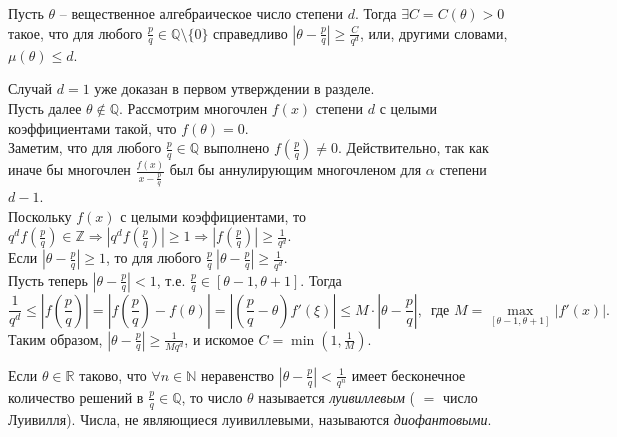 \begin{theorem}[Лиувилля]  \label{l9_Liouv}
	Пусть $\theta$ -- вещественное алгебраическое число степени $d$. Тогда $\exists C = C(\theta) > 0$ такое, что для любого $\displaystyle \frac{p}{q} \in \mathbb{Q} \setminus \lbrace 0 \rbrace$ справедливо $\displaystyle \left|\theta - \frac{p}{q}\right| \geq \frac{C}{q^d}$, или, другими словами, $\mu(\theta) \leq d$.
\end{theorem}
\begin{pf}
	Случай $d = 1$ уже доказан в первом утверждении в разделе.\\
	Пусть далее $\theta \not \in \mathbb{Q}$. Рассмотрим многочлен $f(x)$ степени $d$ с целыми коэффициентами такой, что $f(\theta) = 0$.\\
	Заметим, что для любого $\displaystyle \frac{p}{q} \in \mathbb{Q}$ выполнено $\displaystyle f\left(\frac{p}{q}\right) \ne 0$. Действительно, так как иначе бы многочлен $\displaystyle \frac{f(x)}{x - \frac{p}{q}}$ был бы аннулирующим многочленом для $\alpha$ степени $d - 1$.\\
	Поскольку $f(x)$ с целыми коэффициентами, то $\displaystyle q^d f\left(\frac{p}{q}\right) \in \mathbb{Z} \Rightarrow \left| q^d f\left(\frac{p}{q}\right) \right| \geq 1 \Rightarrow \left| f\left(\frac{p}{q}\right) \right| \geq \frac{1}{q^d}$.\\
	Если $\displaystyle \left| \theta - \frac{p}{q} \right| \geq 1$, то для любого $\displaystyle \frac{p}{q} \ \left|\theta - \frac{p}{q}\right| \geq \frac{1}{q^d}$.\\
	Пусть теперь $\displaystyle \left|\theta - \frac{p}{q}\right| < 1$, т.е. $\displaystyle \frac{p}{q} \in [\theta - 1, \theta + 1]$. Тогда
	$$\frac{1}{q^d} \leq \left| f\left(\frac{p}{q}\right)\right| = \left|f\left(\frac{p}{q}\right) - f\left(\theta\right)\right| = \left|\left(\frac{p}{q} - \theta\right)f'(\xi)\right| \leq M \cdot \left| \theta - \frac{p}{q} \right|, \, \text{ где } M = \max\limits_{[\theta-1,\theta+1]}\left| f'(x) \right|.$$
	Таким образом, $\displaystyle \left| \theta - \frac{p}{q} \right| \geq \frac{1}{Mq^d}$, и искомое $\displaystyle C = \min\left( 1, \frac{1}{M} \right)$.
\end{pf}	

\begin{definition}
	Если $\theta \in \mathbb{R}$ таково, что $\forall n \in \mathbb{N}$ неравенство $\displaystyle \left|\theta - \frac{p}{q}\right| < \frac{1}{q^n}$ имеет бесконечное количество решений в $\displaystyle \frac{p}{q} \in \mathbb{Q}$, то число $\theta$  называется \textit{луивиллевым} ( $=$ число Луивилля). Числа, не являющиеся луивиллевыми, называются \textit{диофантовыми}.
\end{definition}

